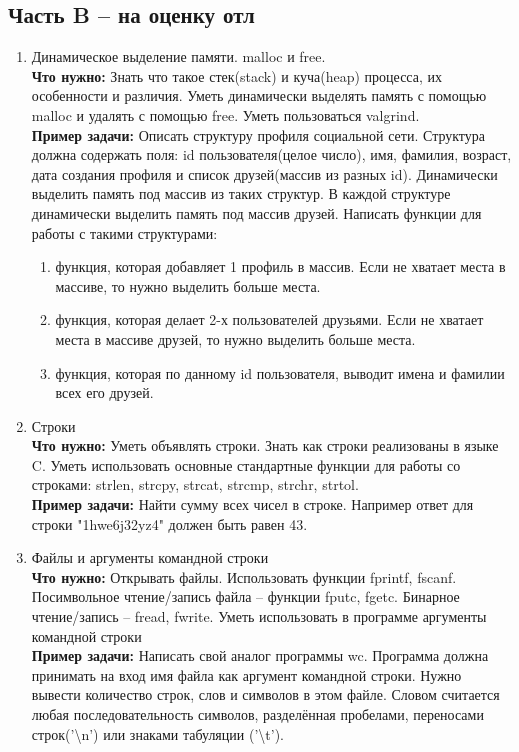 \documentclass{article}
\begin{document}
\subsection*{Часть B -- на оценку отл}
\begin{enumerate}
\item Динамическое выделение памяти. malloc и free. \\
\textbf{Что нужно:} Знать что такое стек(stack) и куча(heap) процесса, их особенности и различия. Уметь динамически выделять память с помощью malloc и удалять с помощью free. Уметь пользоваться valgrind.\\
\textbf{Пример задачи:} Описать структуру профиля социальной сети. Структура должна содержать поля: id пользователя(целое число), имя, фамилия, возраст, дата создания профиля и список друзей(массив из разных id). Динамически выделить память под массив из таких структур. В каждой структуре динамически выделить память под массив друзей. Написать функции для работы с такими структурами:
\begin{enumerate}
\item функция, которая добавляет 1 профиль в массив. Если не хватает места в массиве, то нужно выделить больше места.
\item функция, которая делает 2-х пользователей друзьями. Если не хватает места в массиве друзей, то нужно выделить больше места.
\item функция, которая по данному id пользователя, выводит имена и фамилии всех его друзей.
\end{enumerate}

\item Строки \\
\textbf{Что нужно:} Уметь объявлять строки. Знать как строки реализованы в языке C. Уметь использовать основные стандартные функции для работы со строками: strlen, strcpy, strcat, strcmp, strchr, strtol.\\
\textbf{Пример задачи:} Найти сумму всех чисел в строке. Например ответ для строки "1hwe6j32yz4" должен быть равен 43.

\item Файлы и аргументы командной строки \\
\textbf{Что нужно:} Открывать файлы. Использовать функции fprintf, fscanf. Посимвольное чтение/запись файла -- функции fputc, fgetc. Бинарное чтение/запись -- fread, fwrite. Уметь использовать в программе аргументы командной строки \\
\textbf{Пример задачи:} Написать свой аналог программы wc. Программа должна принимать на вход имя файла как аргумент командной строки. Нужно вывести количество строк, слов и символов в этом файле. Словом считается любая последовательность символов, разделённая пробелами, переносами строк('\textbackslash n') или знаками табуляции ('\textbackslash t').


\end{enumerate}
\end{document}
